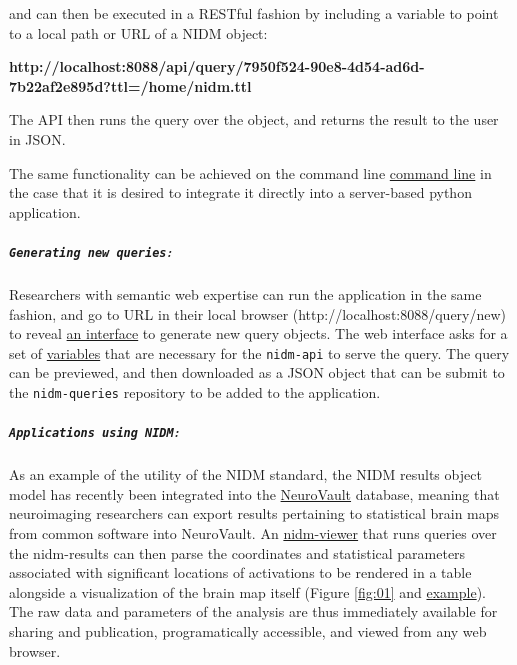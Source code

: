 \documentclass[twocolumn]{bmcart}%
\begin{document}
and can then be executed in a RESTful fashion by including a variable to point to a local path or URL of a NIDM object:\newline

\textbf{http://localhost:8088/api/query/7950f524-90e8-4d54-ad6d-7b22af2e895d?ttl=/home/nidm.ttl}\newline

The API then runs the query over the object, and returns the result to the user in JSON.

The same functionality can be achieved on the command line \href{http://nidm-api.readthedocs.org/en/latest/getting-started.html#integration-into-python}{command line} in the case that it is desired to integrate it directly into a server-based python application.

\subparagraph{\texorpdfstring{\texttt{Generating new queries}:}{:}}\label{section}
Researchers with semantic web expertise can run the application in the same fashion, and go to URL in their local browser (http://localhost:8088/query/new) to reveal \href{http://nidm-api.readthedocs.org/en/latest/development.html#web-query-generator}{an interface} to generate new query objects. The web interface asks for a set of \href{http://nidm-api.readthedocs.org/en/latest/development.html#fields}{variables} that are necessary for the \texttt{nidm-api} to serve the query. The query can be previewed, and then downloaded as a JSON object that can be submit to the \texttt{nidm-queries} repository to be added to the application.\newline

\subparagraph{\texorpdfstring{\texttt{Applications using NIDM}:}{:}}\label{section}
As an example of the utility of the NIDM standard, the NIDM results object model \cite{noauthor_undated-if} has recently been integrated into the \href{http://www.neurovault.org}{NeuroVault} database, meaning that neuroimaging researchers can export results pertaining to statistical brain maps from common software \cite{Jenkinson2012-pr} into NeuroVault. An \href{https://github.com/vsoch/nidmviewer}{nidm-viewer} that runs queries over the nidm-results can then parse the coordinates and statistical parameters associated with significant locations of activations to be rendered in a table alongside a visualization of the brain map itself (Figure \ref{fig:01} and \href{http://neurovault.org/collections/877/fsl_course_av.nidm}{example}). The raw data and parameters of the analysis are thus immediately available for sharing and publication, programatically accessible, and viewed from any web browser. 
\end{document}
